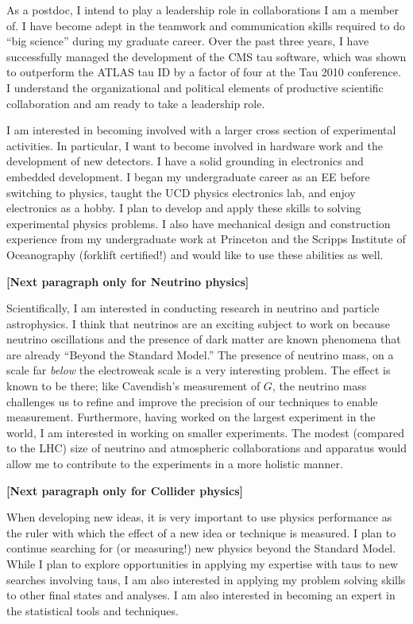 \documentclass{scrartcl}        %
\begin{document}
\begin{cv}{}
As a postdoc, I intend to play a leadership role in collaborations I am a member
of.  I have become adept in the teamwork and communication skills required to do
``big science'' during my graduate career.  Over the past three years, I have
successfully managed the development of the CMS tau software, which was shown to
outperform the ATLAS tau ID by a factor of four at the Tau 2010 conference.  I
understand the organizational and political elements of productive scientific
collaboration and am ready to take a leadership role.

I am interested in becoming involved with a larger cross section of experimental
activities.  In particular, I want to become involved in hardware
work and the development of new detectors. I have a solid grounding in
electronics and embedded development. I began my undergraduate career as an EE
before switching to physics, taught the UCD physics electronics lab, and enjoy
electronics as a hobby.  I plan to develop and apply these skills
to solving experimental physics problems.  I also have mechanical design
and construction experience from my undergraduate work at Princeton and the
Scripps Institute of Oceanography (forklift certified!) and would like to use
these abilities as well.

\textbf{[Next paragraph only for Neutrino physics]}

Scientifically, I am interested in conducting research in neutrino and particle
astrophysics. I think that neutrinos are an exciting subject to work on because
neutrino oscillations and the presence of dark matter are known phenomena that
are already ``Beyond the Standard Model.''  The presence of neutrino mass, on a
scale far \emph{below} the electroweak scale is a very interesting problem.  The
effect is known to be there; like Cavendish's measurement of $G$, the neutrino
mass challenges us to refine and improve the precision of our techniques to
enable measurement.  Furthermore, having worked on the largest experiment in the
world, I am interested in working on smaller experiments.  The modest (compared
to the LHC) size of neutrino and atmospheric collaborations and apparatus would
allow me to contribute to the experiments in a more holistic manner.

\textbf{[Next paragraph only for Collider physics]}

When developing new ideas, it is very important to use physics performance as
the ruler with which the effect of a new idea or technique is measured.  I plan
to continue searching for (or measuring!) new physics beyond the Standard Model.
While I plan to explore opportunities in applying my expertise with taus to new
searches involving taus, I am also interested in applying my problem solving
skills to other final states and analyses.   I am also interested in becoming an
expert in the statistical tools and techniques. 

\end{cv}
\end{document}
